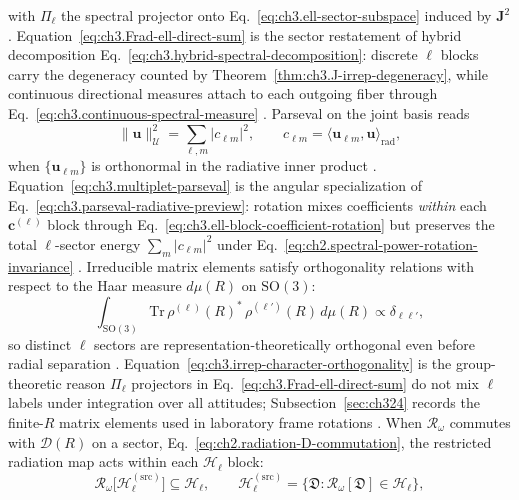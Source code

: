 with \(\Pi_{\ell}\) the spectral projector onto
Eq.~\eqref{eq:ch3.ell-sector-subspace} induced by \(\mathbf{J}^{2}\) \cite{jackson1999}.
Equation~\eqref{eq:ch3.Frad-ell-direct-sum} is the sector restatement of hybrid decomposition
Eq.~\eqref{eq:ch3.hybrid-spectral-decomposition}: discrete \(\ell\) blocks carry the degeneracy counted by
Theorem~\ref{thm:ch3.J-irrep-degeneracy}, while continuous directional measures attach to each outgoing fiber
through Eq.~\eqref{eq:ch3.continuous-spectral-measure} \cite{stratton1941}. Parseval on the
joint basis reads
\begin{equation}
\label{eq:ch3.multiplet-parseval}
\|\mathbf{u}\|_{\mathcal{U}}^{2}
=
\sum_{\ell,m}
|c_{\ell m}|^{2},
\qquad
c_{\ell m}=\langle \mathbf{u}_{\ell m},\mathbf{u}\rangle_{\mathrm{rad}},
\end{equation}
when \(\{\mathbf{u}_{\ell m}\}\) is orthonormal in the radiative inner product
\cite{stratton1941}. Equation~\eqref{eq:ch3.multiplet-parseval} is the angular specialization of
Eq.~\eqref{eq:ch3.parseval-radiative-preview}: rotation mixes coefficients \emph{within} each
\(\mathbf{c}^{(\ell)}\) block through Eq.~\eqref{eq:ch3.ell-block-coefficient-rotation} but preserves the
total \(\ell\)-sector energy \(\sum_{m}|c_{\ell m}|^{2}\) under
Eq.~\eqref{eq:ch2.spectral-power-rotation-invariance} \cite{stratton1941}.
Irreducible matrix elements satisfy orthogonality relations with respect to the Haar measure \(d\mu(R)\) on
\(\mathrm{SO}(3)\):
\begin{equation}
\label{eq:ch3.irrep-character-orthogonality}
\int_{\mathrm{SO}(3)}
\mathrm{Tr}\,\rho^{(\ell)}(R)^{*}\,\rho^{(\ell')}(R)\,d\mu(R)
\propto
\delta_{\ell\ell'},
\end{equation}
so distinct \(\ell\) sectors are representation-theoretically orthogonal even before radial separation
\cite{jackson1999}. Equation~\eqref{eq:ch3.irrep-character-orthogonality} is the group-theoretic
reason \(\Pi_{\ell}\) projectors in Eq.~\eqref{eq:ch3.Frad-ell-direct-sum} do not mix \(\ell\) labels under
integration over all attitudes; Subsection~\ref{sec:ch324} records the finite-\(R\) matrix elements used in
laboratory frame rotations \cite{jackson1999}.
When \(\mathcal{R}_\omega\) commutes with \(\mathcal{D}(R)\) on a sector,
Eq.~\eqref{eq:ch2.radiation-D-commutation}, the restricted radiation map acts within each
\(\mathcal{H}_{\ell}\) block:
\begin{equation}
\label{eq:ch3.radiation-irrep-block}
\mathcal{R}_\omega\big[\mathcal{H}_{\ell}^{(\mathrm{src})}\big]
\subseteq
\mathcal{H}_{\ell},
\qquad
\mathcal{H}_{\ell}^{(\mathrm{src})}
=
\{\mathfrak{D}:\mathcal{R}_\omega[\mathfrak{D}]\in\mathcal{H}_{\ell}\},
\end{equation}

